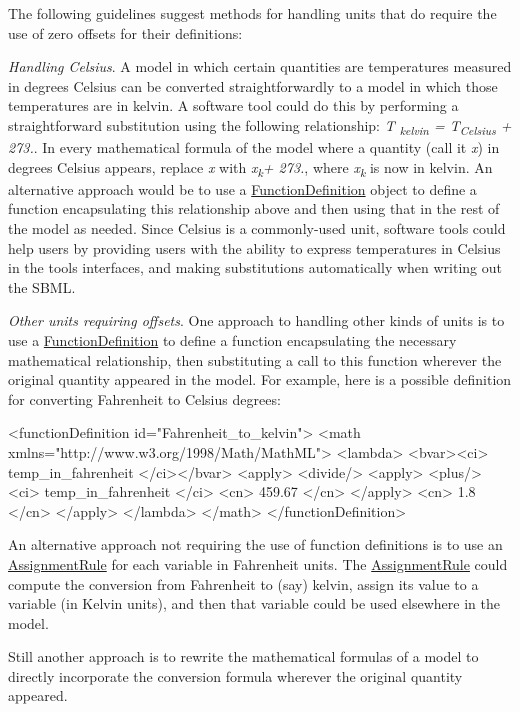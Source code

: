 The following guidelines suggest methods for handling units that do require the use of zero offsets for their definitions\+: 
\begin{DoxyItemize}
\item {\itshape Handling Celsius}. A model in which certain quantities are temperatures measured in degrees Celsius can be converted straightforwardly to a model in which those temperatures are in kelvin. A software tool could do this by performing a straightforward substitution using the following relationship\+: {\itshape T\textsubscript{ kelvin} = T\textsubscript{Celsius} + 273.}. In every mathematical formula of the model where a quantity (call it {\itshape x}) in degrees Celsius appears, replace {\itshape x} with {\itshape x\textsubscript{k}+ 273.}, where {\itshape x\textsubscript{k}} is now in kelvin. An alternative approach would be to use a \hyperlink{class_function_definition}{Function\+Definition} object to define a function encapsulating this relationship above and then using that in the rest of the model as needed. Since Celsius is a commonly-\/used unit, software tools could help users by providing users with the ability to express temperatures in Celsius in the tools\textquotesingle{} interfaces, and making substitutions automatically when writing out the S\+B\+ML.


\item {\itshape Other units requiring offsets}. One approach to handling other kinds of units is to use a \hyperlink{class_function_definition}{Function\+Definition} to define a function encapsulating the necessary mathematical relationship, then substituting a call to this function wherever the original quantity appeared in the model. For example, here is a possible definition for converting Fahrenheit to Celsius degrees\+: \begin{DoxyVerb}<functionDefinition id="Fahrenheit_to_kelvin">
    <math xmlns="http://www.w3.org/1998/Math/MathML">
        <lambda>
            <bvar><ci> temp_in_fahrenheit </ci></bvar>
            <apply>
                <divide/>
                <apply>
                    <plus/>
                    <ci> temp_in_fahrenheit </ci>
                    <cn> 459.67 </cn>
                </apply>
                <cn> 1.8 </cn>
            </apply>
        </lambda>
    </math>
</functionDefinition>
\end{DoxyVerb}



\item An alternative approach not requiring the use of function definitions is to use an \hyperlink{class_assignment_rule}{Assignment\+Rule} for each variable in Fahrenheit units. The \hyperlink{class_assignment_rule}{Assignment\+Rule} could compute the conversion from Fahrenheit to (say) kelvin, assign its value to a variable (in Kelvin units), and then that variable could be used elsewhere in the model.


\item Still another approach is to rewrite the mathematical formulas of a model to directly incorporate the conversion formula wherever the original quantity appeared. 
\end{DoxyItemize}

